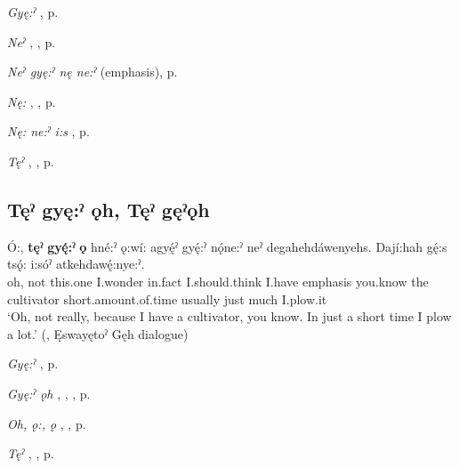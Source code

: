 \begin{CayugaRelated}
\item \textit{Gyę:ˀ} , p. \pageref{p:[gyę:ˀ]}\\
\item \textit{Neˀ} , , p. \pageref{p:[neˀ]}\\
\item \textit{Neˀ gyę:ˀ nę ne:ˀ} (emphasis), p. \pageref{p:[neˀ gyę:ˀ nę ne:ˀ]}\\
\item \textit{Nę:} , , p. \pageref{p:[nę:] ‘this, these’}\\
\item \textit{Nę: ne:ˀ i:s} , p. \pageref{p:[nę: ne:ˀ i:s]}\\
\item \textit{Tęˀ} , , p. \pageref{p:[tęˀ]}
\end{CayugaRelated}

\subsection*{\textbf{Tęˀ gyę:ˀ ǫh, Tęˀ gęˀǫh} } \label{p:[tęˀ gyę:ˀ ǫh]}

\ea
\label{ex:tpart42}
\gll Ó:, \textbf{tęˀ} \textbf{gyę́:ˀ} \textbf{ǫ} hné:ˀ ǫ:wí: agyę́ˀ gyę́:ˀ nǫ́ne:ˀ neˀ degahehdáwenyehs. Dají:hah gę́:s tsǫ́: i:sóˀ atkehdawę́:nye:ˀ.\\
oh, not this.one I.wonder in.fact I.should.think I.have emphasis you.know the cultivator short.amount.of.time usually just much I.plow.it\\
\glt ‘Oh, not really, because I have a cultivator, you know. In just a short time I plow a lot.’ (\cite[420]{mithun_watewayestanih_1984}, Ęswayętoˀ Gęh dialogue)
\z

\begin{CayugaRelated}
\item \textit{Gyę:ˀ} , p. \pageref{p:[gyę:ˀ]}\\
\item \textit{Gyę:ˀ ǫh} , , , p. \pageref{p:[gyę:ˀ ǫh]}\\
\item \textit{Oh, ǫ:, ǫ} , , p. \pageref{p:[ǫh, ǫ:, ǫ]}\\
\item \textit{Tęˀ} , , p. \pageref{p:[tęˀ]}
\end{CayugaRelated}

